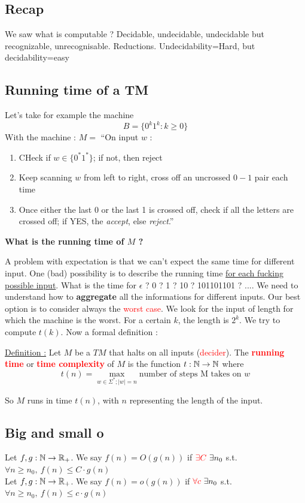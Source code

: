\documentclass[12pt,a4paper]{article}
\newcommand{\<}{\langle}
\renewcommand{\>}{\rangle}
\begin{document}
\subsection{Recap}
We saw what is computable ? Decidable, undecidable, undecidable but recognizable, unrecognisable. Reductions. Undecidability=Hard, but decidability=easy
\subsection{Running time of a TM}
Let's take for example the machine 
\[B = \{0^k1^k : k \geq 0\}\]
With the machine :
$M =$ ``On input $w$ : 
\begin{enumerate}
    \item CHeck if $w \in \{0^*1^*\}$; if not, then reject
    \item Keep scanning $w$ from left to right, cross off an uncrossed $0-1$ pair each time
    \item Once either the last $0$ or the last 1 is crossed off, check if all the letters are crossed off; if YES, the \textit{accept}, else \textit{reject}.''
\end{enumerate}
\begin{center}
    \textbf{What is the running time of $M$ ?}
\end{center}
A problem with expectation is that we can't expect the same time for different input. One (bad) possibility is to describe the running time \uline{for each fucking possible input}. What is the time for $\epsilon$ ? $0$ ? 1 ? 10 ? 101101101 ? .... We need to understand how to \textbf{aggregate} all the informations for different inputs. Our best option is to consider always the \textcolor{red}{worst case}. We look for the input of length for which the machine is the worst. For a certain $k$, the length is $2^k$. We try to compute $t(k)$. Now a formal definition :
\begin{boite}
     \uline{Definition :} Let $M$ be a $TM$ that halts on all inputs (\textcolor{red}{decider}). The \textbf{\textcolor{red}{running time}} or \textbf{\textcolor{red}{time complexity}} of $M$ is the function $t: \mathbb{N} \to \mathbb{N}$ where 
    \begin{equation}
        t(n) = \max_{w \in \Sigma^* ; |w| = n} \text{number of steps M takes on }w
    \end{equation}
\end{boite}
So $M$ runs in time $t(n)$, with $n$ representing the length of the input.
\subsection{Big and small o}
 Let $f,g : \mathbb{N} \to \mathbb{R}_+$. We say $f(n) = O(g(n))$ if $\textcolor{red}{\exists C}\ \exists n_0$ s.t. $\forall n \geq n_0,\ f(n) \leq C\cdot g(n)$\\
 Let $f,g : \mathbb{N} \to \mathbb{R}_+$. We say $f(n) = o(g(n))$ if $\textcolor{red}{\forall c}\ \exists n_0$ s.t. $\forall n \geq n_0,\ f(n) \leq c\cdot g(n)$\\
\end{document}
